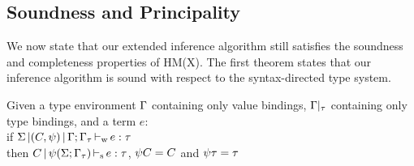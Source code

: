 



\subsection{Soundness and Principality}

We now state that our extended inference algorithm still satisfies the soundness
and completeness properties of HM(X).
%
The first theorem states that our inference algorithm is sound
with respect to the syntax-directed type system.

\begin{theorem}
  Given a type environment $\Gamma$ containing only value bindings,
  $\Gamma|_\tau$ containing only type bindings, and a term $e$:\\
  if $\Sigma \operatorname{|} (C,\mathrm{\psi}) \operatorname{|} \Gamma;\Gamma_\tau \operatorname{\vdash_w} e : \tau$\\
  then $C \operatorname{|} \mathrm{\psi}(\Sigma;\Gamma_\tau) \operatorname{\vdash_s} e : \tau$, $\mathrm{\psi} C = C$ and $\mathrm{\psi} \tau = \tau$
\end{theorem}

